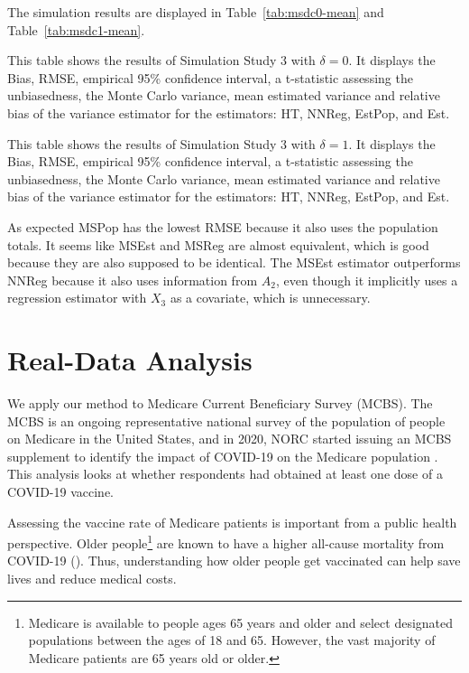 \documentclass[12pt]{article}
\begin{document}
The simulation results are displayed in Table~\ref{tab:msdc0-mean} and
Table~\ref{tab:msdc1-mean}.

\begin{table}[ht!]
  \centering
  
\caption{This table shows the results of Simulation Study 3 with $\delta = 0$.
  It displays the Bias, RMSE, empirical 95\% confidence interval, a t-statistic
  assessing the unbiasedness, the Monte Carlo variance, mean estimated variance
  and relative bias of the variance estimator for the estimators: HT, NNReg,
  EstPop, and Est.}
\label{tab:msdc0-mean}
\end{table}

\begin{table}[ht!]
  \centering
  
\caption{This table shows the results of Simulation Study 3 with $\delta = 1$.
  It displays the Bias, RMSE, empirical 95\% confidence interval, a t-statistic
  assessing the unbiasedness, the Monte Carlo variance, mean estimated variance
  and relative bias of the variance estimator for the estimators: HT, NNReg,
  EstPop, and Est.}
\label{tab:msdc1-mean}
\end{table}

As expected MSPop has the lowest RMSE because it also uses the population
totals. It seems like MSEst and MSReg are almost equivalent, which is good
because they are also supposed to be identical. The MSEst estimator outperforms
NNReg because it also uses information from $A_2$, even though it implicitly
uses a regression estimator with $X_3$ as a covariate, which is unnecessary.

\section{Real-Data Analysis}

We apply our method to Medicare Current Beneficiary Survey (MCBS). The MCBS
is an ongoing representative national survey of the population of people on
Medicare in the United States, and in 2020, NORC started issuing an MCBS
supplement to identify the impact of COVID-19 on the Medicare population
\cite{norc2020mcbs}. This analysis looks at whether
respondents had obtained at least one dose of a COVID-19 vaccine.

Assessing the vaccine rate of Medicare patients is important from a public
health perspective. Older people\footnote{Medicare is available to people ages
65 years and older and select designated populations between the ages of 18 and
65. However, the vast majority of Medicare patients are 65 years old or older.}
are known to have a higher all-cause mortality from
COVID-19 (\cite{bonanad2020effect}). Thus, understanding how older people get
vaccinated can help save lives and reduce medical costs.
\end{document}
